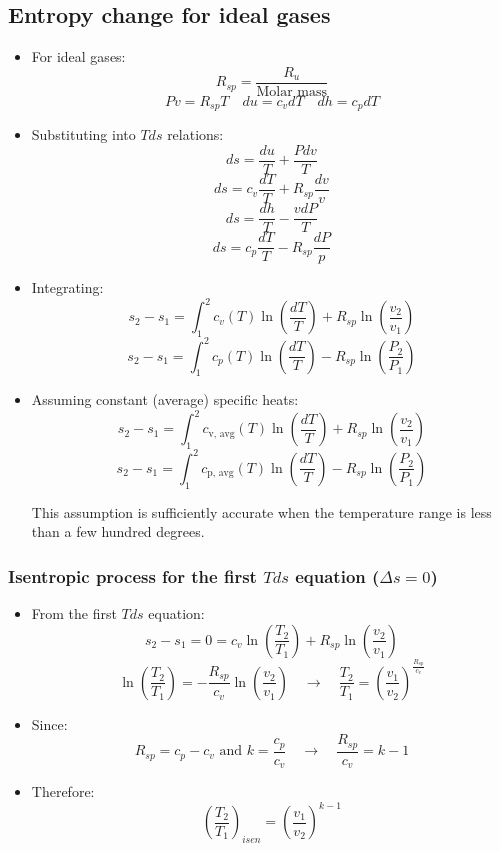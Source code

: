 \documentclass[11pt]{article}
\begin{document}
\subsection{Entropy change for ideal gases}
\label{sec:orgab50b4d}
\begin{itemize}
\item For ideal gases:
\[R_{sp} = \frac{R_u}{\text{Molar mass}}\]
\[Pv = R_{sp} T \quad du = c_v dT \quad dh = c_p dT\]
\item Substituting into \(Tds\) relations:
\[ds = \frac{du}{T} + \frac{P dv}{T}\]
\[ds = c_v \frac{dT}{T} + R_{sp} \frac{dv}{v}\]
\[ds = \frac{dh}{T} - \frac{v dP}{T}\]
\[ds = c_p \frac{dT}{T} - R_{sp} \frac{dP}{p}\]
\item Integrating:
\[s_2 - s_1 = \int_1^2 c_v(T) \ln \left(\frac{dT}{T} \right)+ R_{sp} \ln \left(\frac{v_2}{v_1} \right)\]
\[s_2 - s_1 = \int_1^2 c_p(T) \ln \left(\frac{dT}{T} \right) - R_{sp} \ln \left(\frac{P_2}{P_1} \right)\]
\item Assuming constant (average) specific heats:
\[s_2 - s_1 = \int_1^2 c_{\text{v, avg}}(T) \ln \left(\frac{dT}{T} \right) + R_{sp} \ln \left(\frac{v_2}{v_1} \right)\]
\[s_2 - s_1 = \int_1^2 c_{\text{p, avg}}(T) \ln \left(\frac{dT}{T} \right) - R_{sp} \ln \left(\frac{P_2}{P_1} \right)\]

This assumption is sufficiently accurate when the temperature range is less than a few hundred degrees.
\end{itemize}

\subsubsection{Isentropic process for the first \(Tds\) equation (\(\Delta s = 0\))}
\label{sec:org1beff4b}
\begin{itemize}
\item From the first \(Tds\) equation:
\[s_2 - s_1 = 0 = c_v \ln \left( \frac{T_2}{T_1} \right) + R_{sp} \ln \left( \frac{v_2}{v_1} \right)\]
\[\ln \left(\frac{T_2}{T_1} \right) = - \frac{R_{sp}}{c_v} \ln \left( \frac{v_2}{v_1} \right) \quad \rightarrow \quad \frac{T_2}{T_1} = \left(\frac{v_1}{v_2} \right)^{\frac{R_{sp}}{c_v}}\]

\item Since:
\[R_{sp} = c_p - c_v \text{ and } k = \frac{c_p}{c_v} \quad \rightarrow \quad \frac{R_{sp}}{c_v} = k - 1\]

\item Therefore:
\[\left(\frac{T_2}{T_1} \right)_{isen} = \left(\frac{v_1}{v_2} \right)^{k - 1}\]
\end{itemize}
\end{document}
